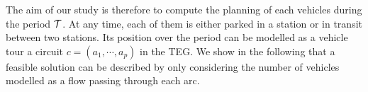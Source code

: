 \begin{bibunit}[ieeetr]
%
%
%
%

The aim of our study is therefore to compute the planning of each vehicles during the period $\mathcal{T}$. 
At any time, each of them is either parked in a station or in transit between two stations.
Its position over the period can be modelled as a vehicle tour \ie a circuit $c=(a_1,\cdots, a_p)$ in the TEG.
We show in the following that a feasible solution can be described by only considering the number of vehicles modelled as a flow passing through each arc.


\end{bibunit}

